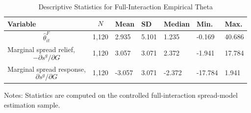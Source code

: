 \begin{table}[H]\centering
\begin{threeparttable}
\caption{Descriptive Statistics for Full-Interaction Empirical Theta}
\label{tab:theta_descriptive_stats}
\scriptsize
\begin{tabularx}{\textwidth}{lYYYYYY}
\toprule
Variable & $$N$$ & Mean & SD & Median & Min. & Max. \\
\midrule
$$\widehat{\theta}^{F}_{it}$$ & 1,120 & 2.935 & 5.101 & 1.235 & -0.169 & 40.686 \\
Marginal spread relief, $$-\partial s^g/\partial G$$ & 1,120 & 3.057 & 3.071 & 2.372 & -1.941 & 17.784 \\
Marginal spread response, $$\partial s^g/\partial G$$ & 1,120 & -3.057 & 3.071 & -2.372 & -17.784 & 1.941 \\
\bottomrule
\end{tabularx}
\begin{tablenotes}[flushleft]\footnotesize
\item Notes: Statistics are computed on the controlled full-interaction spread-model estimation sample.
\end{tablenotes}
\end{threeparttable}
\end{table}
